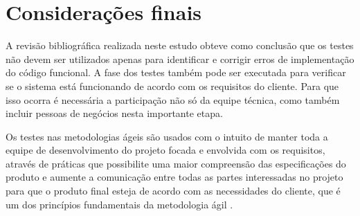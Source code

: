 \chapter{Considerações finais}\label{CAP:3}

A revisão bibliográfica realizada neste estudo obteve como conclusão que os testes não devem ser utilizados apenas para identificar e corrigir erros de implementação do código funcional. A fase dos testes também pode ser executada  para verificar se o sistema está funcionando de acordo com os requisitos do cliente. Para que isso ocorra é necessária a participação não só da equipe técnica, como também incluir pessoas de negócios nesta importante etapa.

Os testes nas metodologias ágeis são usados com o intuito de manter toda a equipe de desenvolvimento do projeto focada e envolvida com os requisitos, através de práticas que possibilite uma maior compreensão das especificações do produto e aumente a comunicação entre todas as partes interessadas no projeto para que o produto final esteja de acordo com as necessidades do cliente, que é um dos princípios fundamentais da metodologia ágil . 
